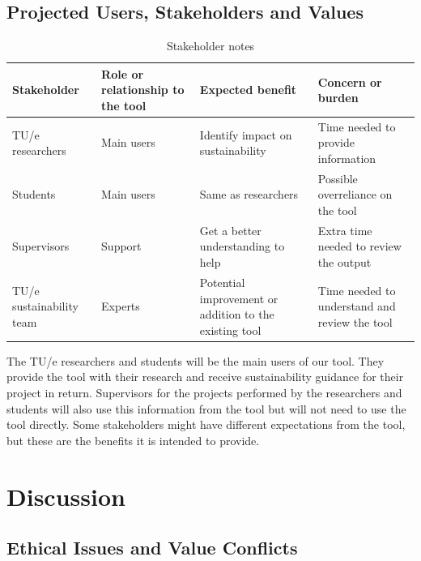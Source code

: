 \documentclass[11pt,a4paper]{article}
\begin{document}



\FloatBarrier
\subsection{Projected Users, Stakeholders and Values}
\begin{table}[ht]
\centering
\begin{tabularx}{\textwidth}{|X|X|X|X|}
\hline
\textbf{Stakeholder} & \textbf{Role or relationship to the tool} & 
\textbf{Expected benefit} & \textbf{Concern or burden} \\
\hline

TU/e researchers &
Main users &
Identify impact on sustainability &
Time needed to provide information \\
\hline

Students &
Main users &
Same as researchers &
Possible overreliance on the tool \\
\hline

Supervisors &
Support &
Get a better understanding to help &
Extra time needed to review the output 
\\
\hline

TU/e sustainability team &
Experts &
Potential improvement or addition to the existing tool &
Time needed to understand and review the tool \\
\hline

\end{tabularx}
\caption{Stakeholder notes}
\label{tab:stakeholders}
\end{table}

The TU/e researchers and students will be the main users of our tool. They provide the tool with their research and receive sustainability guidance for their project in return.  Supervisors for the projects performed by the researchers and students will also use this information from the tool but will not need to use the tool directly.  Some stakeholders might have different expectations from the tool, but these are the benefits it is intended to provide.

\FloatBarrier
\clearpage
\section{Discussion}

\subsection{Ethical Issues and Value Conflicts}
\end{document}
